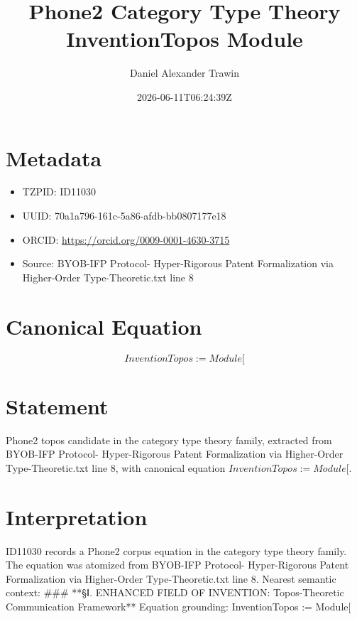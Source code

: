 \documentclass[11pt]{article}
\title{Phone2 Category Type Theory InventionTopos Module}
\author{Daniel Alexander Trawin}
\date{2026-06-11T06:24:39Z}
\begin{document}
\maketitle
\section*{Metadata}
\begin{itemize}
\item TZPID: ID11030
\item UUID: 70a1a796-161c-5a86-afdb-bb0807177e18
\item ORCID: \url{https://orcid.org/0009-0001-4630-3715}
\item Source: BYOB-IFP Protocol- Hyper-Rigorous Patent Formalization via Higher-Order Type-Theoretic.txt line 8
\end{itemize}
\section*{Canonical Equation}
\[
InventionTopos := Module[
\]
\section*{Statement}
Phone2 topos candidate in the category type theory family, extracted from BYOB-IFP Protocol- Hyper-Rigorous Patent Formalization via Higher-Order Type-Theoretic.txt line 8, with canonical equation $InventionTopos := Module[$.
\section*{Interpretation}
ID11030 records a Phone2 corpus equation in the category type theory family. The equation was atomized from BYOB-IFP Protocol- Hyper-Rigorous Patent Formalization via Higher-Order Type-Theoretic.txt line 8. Nearest semantic context: ### **§Ⅰ. ENHANCED FIELD OF INVENTION: Topos-Theoretic Communication Framework** Equation grounding: InventionTopos := Module[
\end{document}
